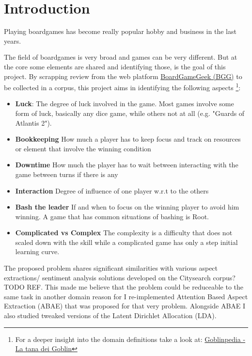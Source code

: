 \section{Introduction}

Playing boardgames has become really popular hobby and business in the last years.

The field of boardgames is very broad and games can be very different.
But at the core some elements are shared and identifying those, is the goal of this project.
By scrapping review from the web platform \href{https://boardgamegeek.com/}{BoardGameGeek (BGG)}
to be collected in a corpus, this project aims in identifying the following aspects
\footnote{For a deeper insight into the domain definitions take a look at: \href{https://www.goblins.net/goblinpedia}{Goblinpedia - La tana dei Goblin}}:
\begin{itemize}
    \item{\textbf{Luck}:} The degree of luck involved in the game.
    Most games involve some form of luck, basically any dice game, while others not at all (e.g. "Guards of Atlantis 2").
    \item{\textbf{Bookkeeping}} How much a player has to keep focus and track on resources or element that involve the winning condition
    \item{\textbf{Downtime}} How much the player has to wait between interacting with the game between turns if there is any
    \item{\textbf{Interaction}} Degree of influence of one player w.r.t to the others
    \item{\textbf{Bash the leader}} If and when to focus on the winning player to avoid him winning.
    A game that has common situations of bashing is Root.
    \item{\textbf{Complicated vs Complex}} The complexity is a difficulty that does not scaled down with the skill while
    a complicated game has only a step initial learning curve.
\end{itemize}

The proposed problem shares significant similarities with various aspect extractions/ sentiment analysis solutions
developed on the Citysearch corpus?TODO REF. This made me believe that the problem could be reduceable to the same task
in another domain reason for I re-implemented Attention Based Aspect Extraction (ABAE)\cite{he-etal-2017-unsupervised} that was proposed for that very problem.
Alongside ABAE I also studied tweaked versions of the Latent Dirichlet Allocation (LDA).

